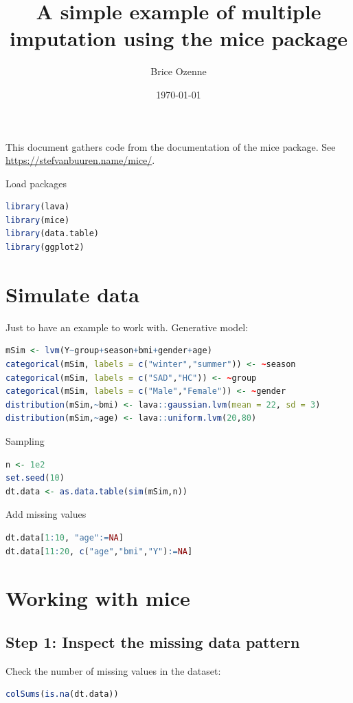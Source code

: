 \documentclass[12pt]{article}
\author{Brice Ozenne}
\date{\today}
\title{A simple example of multiple imputation using the mice package}
\begin{document}
\maketitle
This document gathers code from the documentation of the mice
package. See \url{https://stefvanbuuren.name/mice/}.

\bigskip

Load packages
\begin{lstlisting}[language=r,numbers=none]
library(lava)
library(mice)
library(data.table)
library(ggplot2)
\end{lstlisting}
\section{Simulate data}
\label{sec:org4d32e4c}

Just to have an example to work with. Generative model:
\begin{lstlisting}[language=r,numbers=none]
mSim <- lvm(Y~group+season+bmi+gender+age)
categorical(mSim, labels = c("winter","summer")) <- ~season
categorical(mSim, labels = c("SAD","HC")) <- ~group
categorical(mSim, labels = c("Male","Female")) <- ~gender
distribution(mSim,~bmi) <- lava::gaussian.lvm(mean = 22, sd = 3)
distribution(mSim,~age) <- lava::uniform.lvm(20,80)
\end{lstlisting}

Sampling
\begin{lstlisting}[language=r,numbers=none]
n <- 1e2
set.seed(10)
dt.data <- as.data.table(sim(mSim,n))
\end{lstlisting}

Add missing values
\begin{lstlisting}[language=r,numbers=none]
dt.data[1:10, "age":=NA]
dt.data[11:20, c("age","bmi","Y"):=NA]
\end{lstlisting}

\clearpage
\section{Working with mice}
\label{sec:org02bf03b}

\subsection{Step 1: Inspect the missing data pattern}
\label{sec:orgd61b74d}
Check the number of missing values in the dataset:
\begin{lstlisting}[language=r,numbers=none]
colSums(is.na(dt.data))
\end{lstlisting}
\end{document}
